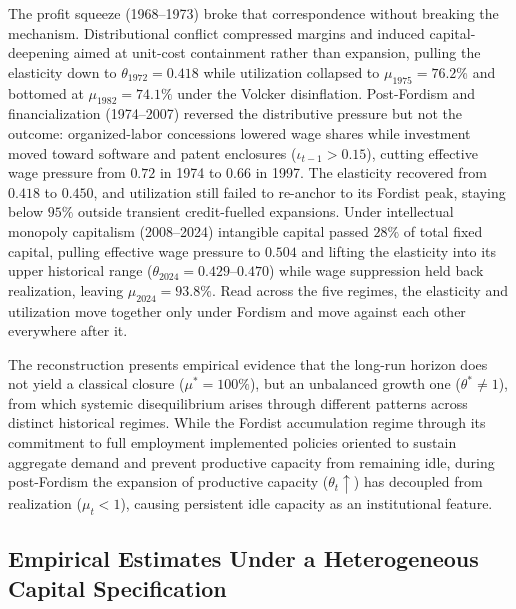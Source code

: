 The profit squeeze (1968--1973) broke that correspondence without
breaking the mechanism. Distributional conflict compressed margins and
induced capital-deepening aimed at unit-cost containment rather than
expansion, pulling the elasticity down to $\theta_{1972} = 0.418$ while
utilization collapsed to $\mu_{1975} = 76.2\%$ and bottomed at
$\mu_{1982} = 74.1\%$ under the Volcker disinflation. Post-Fordism and
financialization (1974--2007) reversed the distributive pressure but not
the outcome: organized-labor concessions lowered wage shares while
investment moved toward software and patent enclosures
($\iota_{t-1} > 0.15$), cutting effective wage pressure from $0.72$ in
1974 to $0.66$ in 1997. The elasticity recovered from $0.418$ to
$0.450$, and utilization still failed to re-anchor to its Fordist peak,
staying below $95\%$ outside transient credit-fuelled expansions. Under
intellectual monopoly capitalism (2008--2024) intangible capital passed
$28\%$ of total fixed capital, pulling effective wage pressure to
$0.504$ and lifting the elasticity into its upper historical range
($\theta_{2024} = 0.429$--$0.470$) while wage suppression held back
realization, leaving $\mu_{2024} = 93.8\%$. Read across the five
regimes, the elasticity and utilization move together only under Fordism
and move against each other everywhere after it.

The reconstruction presents empirical evidence that the long-run horizon does not yield a classical closure ($\mu^* = 100\%$), 
but an unbalanced growth one ($\theta^* \neq 1$), from which systemic disequilibrium arises through different patterns across distinct historical regimes.  
While the Fordist accumulation regime through its commitment to full employment implemented policies oriented to sustain aggregate demand and prevent productive capacity from remaining idle, during post-Fordism the expansion of productive capacity ($\theta_t \uparrow$) has decoupled from realization ($\mu_t < 1$), causing persistent idle capacity as an institutional feature.


\subsection{Empirical Estimates Under a Heterogeneous Capital Specification}
\label{sec:432:specB_results}

